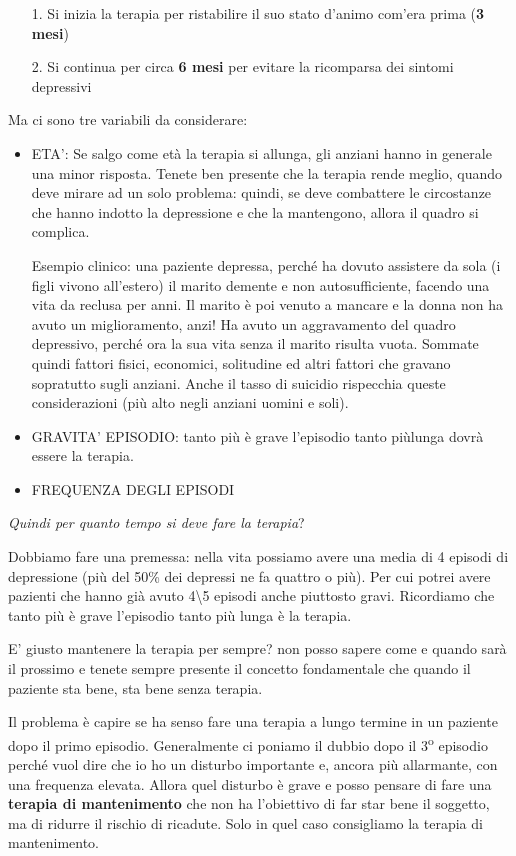 \begin{itemize}
\item[1.]
  Si inizia la terapia per ristabilire il suo stato d'animo com'era
  prima (\textbf{3 mesi})
\item[2.]
  Si continua per circa \textbf{6 mesi} per evitare la ricomparsa dei
  sintomi depressivi
\end{itemize}

Ma ci sono tre variabili da considerare:

\begin{itemize}
\item
  ETA': Se salgo come età la terapia si allunga, gli anziani hanno in
  generale una minor risposta. Tenete ben presente che la terapia rende
  meglio, quando deve mirare ad un solo problema: quindi, se deve
  combattere le circostanze che hanno indotto la depressione e che la
  mantengono, allora il quadro si complica.

Esempio clinico: una paziente depressa, perché ha dovuto assistere da
sola (i figli vivono all'estero) il marito demente e non
autosufficiente, facendo una vita da reclusa per anni. Il marito è poi
venuto a mancare e la donna non ha avuto un miglioramento, anzi! Ha
avuto un aggravamento del quadro depressivo, perché ora la sua vita
senza il marito risulta vuota. Sommate quindi fattori fisici, economici,
solitudine ed altri fattori che gravano sopratutto sugli anziani. Anche
il tasso di suicidio rispecchia queste considerazioni (più alto negli
anziani uomini e soli).

\item
  GRAVITA' EPISODIO: tanto più è grave l'episodio tanto piùlunga dovrà
  essere la terapia.
\item
  FREQUENZA DEGLI EPISODI
\end{itemize}

\emph{Quindi per quanto tempo si deve fare la terapia}?

Dobbiamo fare una premessa: nella vita possiamo avere una media di 4
episodi di depressione (più del 50\% dei depressi ne fa quattro o più).
Per cui potrei avere pazienti che hanno già avuto 4\textbackslash{}5
episodi anche piuttosto gravi. Ricordiamo che tanto più è grave
l'episodio tanto più lunga è la terapia.

E' giusto mantenere la terapia per sempre? non posso sapere come e
quando sarà il prossimo e tenete sempre presente il concetto
fondamentale che quando il paziente sta bene, sta bene senza terapia.

Il problema è capire se ha senso fare una terapia a lungo termine in un
paziente dopo il primo episodio. Generalmente ci poniamo il dubbio dopo
il 3\textsuperscript{o} episodio perché vuol dire che io ho un disturbo importante e,
ancora più allarmante, con una frequenza elevata. Allora quel disturbo è
grave e posso pensare di fare una \textbf{terapia di mantenimento} che
non ha l'obiettivo di far star bene il soggetto, ma di ridurre il
rischio di ricadute. Solo in quel caso consigliamo la terapia di
mantenimento.

